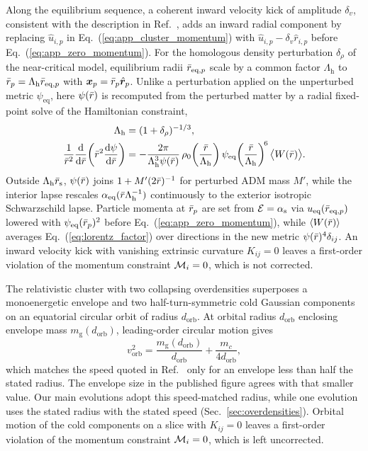 Along the equilibrium sequence, a coherent inward velocity kick of amplitude $\delta_v$, consistent with the description in Ref.~\cite{Wu:2026nrpic}, adds an inward radial component by replacing $\hat{u}_{i,p}$ in Eq.~(\ref{eq:app_cluster_momentum}) with $\hat{u}_{i,p}-\delta_v\hat{r}_{i,p}$ before Eq.~(\ref{eq:app_zero_momentum}). For the homologous density perturbation $\delta_\rho$ of the near-critical model, equilibrium radii $\bar{r}_{\mathrm{eq},p}$ scale by a common factor $\Lambda_{\mathrm{h}}$ to $\bar{r}_p=\Lambda_{\mathrm{h}}\bar{r}_{\mathrm{eq},p}$ with $\bm{x}_p=\bar{r}_p\hat{\bm{r}}_p$. Unlike a perturbation applied on the unperturbed metric $\psi_{\mathrm{eq}}$, here $\psi(\bar{r})$ is recomputed from the perturbed matter by a radial fixed-point solve of the Hamiltonian constraint,
\begin{align}\label{eq:app_perturbed_hc}
\Lambda_{\mathrm{h}}&=(1+\delta_\rho)^{-1/3},\nonumber\\
\frac{1}{\bar{r}^2}\frac{\mathrm{d}}{\mathrm{d}\bar{r}}\!\left(\bar{r}^2\frac{\mathrm{d}\psi}{\mathrm{d}\bar{r}}\right)&=-\frac{2\pi}{\Lambda_{\mathrm{h}}^3\psi(\bar{r})}\,\rho_0\!\left(\frac{\bar{r}}{\Lambda_{\mathrm{h}}}\right)\psi_{\mathrm{eq}}\!\left(\frac{\bar{r}}{\Lambda_{\mathrm{h}}}\right)^{\!6}\bigl\langle W(\bar{r})\bigr\rangle.
\end{align}
Outside $\Lambda_{\mathrm{h}}\bar{r}_{\mathrm{s}}$, $\psi(\bar{r})$ joins $1+M'(2\bar{r})^{-1}$ for perturbed ADM mass $M'$, while the interior lapse rescales $\alpha_{\mathrm{eq}}(\bar{r}\Lambda_{\mathrm{h}}^{-1})$ continuously to the exterior isotropic Schwarzschild lapse. Particle momenta at $\bar{r}_p$ are set from $\mathcal{E}=\alpha_{\mathrm{s}}$ via $u_{\mathrm{eq}}(\bar{r}_{\mathrm{eq},p})$ lowered with $\psi_{\mathrm{eq}}(\bar{r}_p)^2$ before Eq.~(\ref{eq:app_zero_momentum}), while $\langle W(\bar{r})\rangle$ averages Eq.~(\ref{eq:lorentz_factor}) over directions in the new metric $\psi(\bar{r})^4\delta_{ij}$. An inward velocity kick with vanishing extrinsic curvature $K_{ij}=0$ leaves a first-order violation of the momentum constraint $\mathcal{M}_i=0$, which is not corrected.

The relativistic cluster with two collapsing overdensities superposes a monoenergetic envelope and two half-turn-symmetric cold Gaussian components on an equatorial circular orbit of radius $d_{\mathrm{orb}}$. At orbital radius $d_{\mathrm{orb}}$ enclosing envelope mass $m_{\mathrm{g}}(d_{\mathrm{orb}})$, leading-order circular motion gives
\begin{equation}\label{eq:app_circular_speed}
v_{\mathrm{orb}}^2=\frac{m_{\mathrm{g}}(d_{\mathrm{orb}})}{d_{\mathrm{orb}}}+\frac{m_c}{4d_{\mathrm{orb}}},
\end{equation}
which matches the speed quoted in Ref.~\cite{Wu:2026nrpic} only for an envelope less than half the stated radius. The envelope size in the published figure agrees with that smaller value. Our main evolutions adopt this speed-matched radius, while one evolution uses the stated radius with the stated speed (Sec.~\ref{sec:overdensities}). Orbital motion of the cold components on a slice with $K_{ij}=0$ leaves a first-order violation of the momentum constraint $\mathcal{M}_i=0$, which is left uncorrected.
